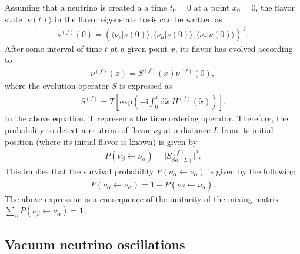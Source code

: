 \documentclass[twocolumn,secnumarabic,amssymb, nobibnotes, aps, prd,10pt]{revtex4-1}
\newcommand{\kt}[1]{\vert #1 \rangle}
\newcommand{\bt}[2]{\langle #1 \vert #2 \rangle}
\begin{document}
Assuming that a neutrino is created a a time $t_0 = 0$ at a point $x_0 = 0$, the flavor
state $\kt{\nu (t)}$ in the flavor eigenstate basis can be written as 
\begin{align}
\nu^{(f)} (0) = \left( \bt{\nu_e}{\nu(0)}, \bt{\nu_\mu}{\nu(0)}, \bt{\nu_\tau}{\nu(0)}
\right)^\mathrm{T}.
\end{align}
After some interval of time $t$ at a given point $x$, its flavor has evolved  according to
\begin{align}
\nu^{(f)} (x) = S^{(f)} (x) \nu^{(f)}(0),
\end{align}
where the evolution operator $S$ is expressed as
\begin{align}
S^{(f)} = T \left[ \mathrm{exp} \left( - \mathrm{i} \int_{0}^{x} \mathrm{d}\tilde{x} \:
H^{(f)} (\tilde{x}) \right) \right].
\end{align}
In the above equation, $\mathrm{T}$ represents the time ordering operator. Therefore, 
the probability to detect a neutrino of flavor $\nu_\beta$ at a distance $L$
from its initial position (where its initial flavor is known) is given by
\begin{align}
P (\nu_\beta \longleftarrow \nu_\alpha) = \vert S^{(f)}_{\beta \alpha (L)} \vert^2.
\label{eq:prob_s}
\end{align}
This implies that the survival probability $P (\nu_\alpha \longleftarrow \nu_\alpha)$
is given by the following
\begin{align}
P (\nu_\alpha \longleftarrow \nu_\alpha) = 1 - P (\nu_\beta \longleftarrow \nu_\alpha).
\end{align}
The above expression is a consequence of the unitarity of the mixing matrix 
$\sum_\beta P (\nu_\beta \longleftarrow \nu_\alpha) = 1$.


\subsection{Vacuum neutrino oscillations}
\label{subsec:2neutrinoOsc}
\end{document}
